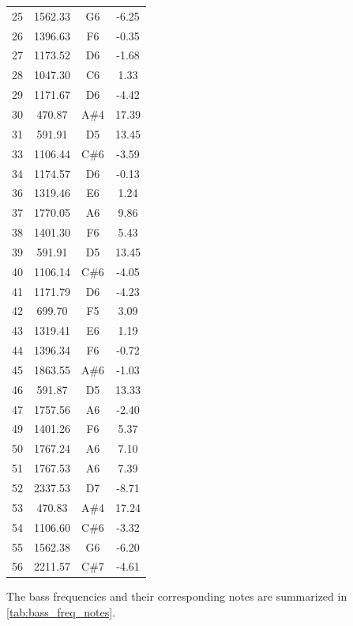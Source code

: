 \begin{table}[H]
\begin{tabular}{cccc}
        25 & 1562.33 & G6    & -6.25   \\
        26 & 1396.63 & F6    & -0.35   \\
        27 & 1173.52 & D6    & -1.68   \\
        28 & 1047.30 & C6    & 1.33    \\
        29 & 1171.67 & D6    & -4.42   \\
        30 & 470.87  & A\#4  & 17.39   \\
        31 & 591.91  & D5    & 13.45   \\
        33 & 1106.44 & C\#6  & -3.59   \\
        34 & 1174.57 & D6    & -0.13   \\
        36 & 1319.46 & E6    & 1.24    \\
        37 & 1770.05 & A6    & 9.86    \\
        38 & 1401.30 & F6    & 5.43    \\
        39 & 591.91  & D5    & 13.45   \\
        40 & 1106.14 & C\#6  & -4.05   \\
        41 & 1171.79 & D6    & -4.23   \\
        42 & 699.70  & F5    & 3.09    \\
        43 & 1319.41 & E6    & 1.19    \\
        44 & 1396.34 & F6    & -0.72   \\
        45 & 1863.55 & A\#6  & -1.03   \\
        46 & 591.87  & D5    & 13.33   \\
        47 & 1757.56 & A6    & -2.40   \\
        49 & 1401.26 & F6    & 5.37    \\
        50 & 1767.24 & A6    & 7.10    \\
        51 & 1767.53 & A6    & 7.39    \\
        52 & 2337.53 & D7    & -8.71   \\
        53 & 470.83  & A\#4  & 17.24   \\
        54 & 1106.60 & C\#6  & -3.32   \\
        55 & 1562.38 & G6    & -6.20   \\
        56 & 2211.57 & C\#7  & -4.61   \\
        \hline
    \end{tabular}
    \label{tab:melody_freq_notes}
\end{table}

The bass frequencies and their corresponding notes are summarized in \autoref{tab:bass_freq_notes}. 


